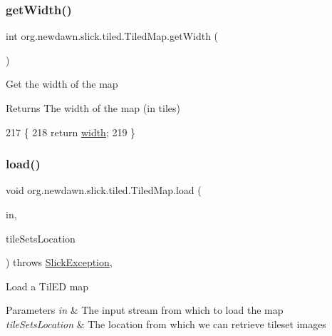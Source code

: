 \subsubsection{\texorpdfstring{get\+Width()}{getWidth()}}
{\footnotesize\ttfamily int org.\+newdawn.\+slick.\+tiled.\+Tiled\+Map.\+get\+Width (\begin{DoxyParamCaption}{ }\end{DoxyParamCaption})\hspace{0.3cm}{\ttfamily [inline]}}

Get the width of the map

\begin{DoxyReturn}{Returns}
The width of the map (in tiles) 
\end{DoxyReturn}

\begin{DoxyCode}
217                           \{
218         \textcolor{keywordflow}{return} \mbox{\hyperlink{classorg_1_1newdawn_1_1slick_1_1tiled_1_1_tiled_map_a13b00efd90dfee0ccc7474310e40199e}{width}};
219     \}
\end{DoxyCode}
\mbox{\label{classorg_1_1newdawn_1_1slick_1_1tiled_1_1_tiled_map_af1c08899abc9e8c33cb08704b764e498}} 
\subsubsection{\texorpdfstring{load()}{load()}}
{\footnotesize\ttfamily void org.\+newdawn.\+slick.\+tiled.\+Tiled\+Map.\+load (\begin{DoxyParamCaption}\item[{Input\+Stream}]{in,  }\item[{String}]{tile\+Sets\+Location }\end{DoxyParamCaption}) throws \mbox{\hyperlink{classorg_1_1newdawn_1_1slick_1_1_slick_exception}{Slick\+Exception}}\hspace{0.3cm}{\ttfamily [inline]}, {\ttfamily [private]}}

Load a Til\+ED map


\begin{DoxyParams}{Parameters}
{\em in} & The input stream from which to load the map \\
\hline
{\em tile\+Sets\+Location} & The location from which we can retrieve tileset images \\
\hline
\end{DoxyParams}

